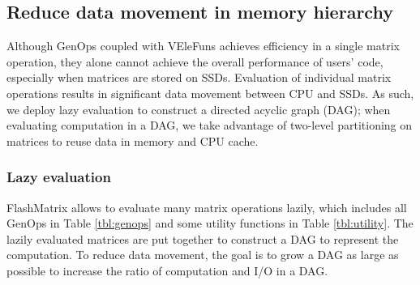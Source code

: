 

\subsection{Reduce data movement in memory hierarchy}
Although GenOps coupled with VEleFuns achieves efficiency in a single matrix
operation, they alone cannot achieve the overall performance of users' code,
especially when matrices are stored on SSDs. Evaluation of individual matrix
operations results in significant data movement between CPU and SSDs.
As such, we deploy lazy evaluation to construct a directed acyclic graph (DAG);
when evaluating computation in a DAG, we take advantage of two-level partitioning
on matrices to reuse data in memory and CPU cache.

\subsubsection{Lazy evaluation} \label{sec:lazy_eval}
FlashMatrix allows to evaluate many matrix operations lazily, which includes
all GenOps in Table \ref{tbl:genops} and some utility functions in Table
\ref{tbl:utility}. The lazily evaluated matrices are put together to construct
a DAG to represent the computation. To reduce data movement, the goal is to
grow a DAG as large as possible to increase the ratio of computation and
I/O in a DAG.

